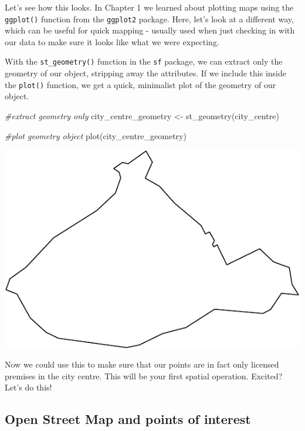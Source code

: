 \documentclass[
]{book}
\makeatletter
\newenvironment{Shaded}{\begin{snugshade}}{\end{snugshade}}
\newcommand{\CommentTok}[1]{\textcolor[rgb]{0.37,0.37,0.37}{\textit{#1}}}
\newcommand{\FunctionTok}[1]{\textcolor[rgb]{0,0,0}{#1}}
\newcommand{\NormalTok}[1]{#1}
\newcommand{\OtherTok}[1]{\textcolor[rgb]{0.37,0.37,0.37}{#1}}
\newenvironment{kframe}{%
\medskip{}
\setlength{\fboxsep}{.8em}
 \def\at@end@of@kframe{}%
 \ifinner\ifhmode%
  \def\at@end@of@kframe{\end{minipage}}%
  \begin{minipage}{\columnwidth}%
 \fi\fi%
 \def\FrameCommand##1{\hskip\@totalleftmargin \hskip-\fboxsep
 \colorbox{shadecolor}{##1}\hskip-\fboxsep
     \hskip-\linewidth \hskip-\@totalleftmargin \hskip\columnwidth}%
 \MakeFramed {\advance\hsize-\width
   \@totalleftmargin\z@ \linewidth\hsize
   \@setminipage}}%
 {\par\unskip\endMakeFramed%
 \at@end@of@kframe}
\renewenvironment{Shaded}{\begin{kframe}}{\end{kframe}}
\makeatother
\begin{document}
Let's see how this looks. In Chapter 1 we learned about plotting maps using the \texttt{ggplot()} function from the \texttt{ggplot2} package. Here, let's look at a different way, which can be useful for quick mapping - usually used when just checking in with our data to make sure it looks like what we were expecting.

With the \texttt{st\_geometry()} function in the \texttt{sf} package, we can extract only the geometry of our object, stripping away the attributes. If we include this inside the \texttt{plot()} function, we get a quick, minimalist plot of the geometry of our object.

\begin{Shaded}
\begin{Highlighting}[]
\CommentTok{\#extract geometry only}
\NormalTok{city\_centre\_geometry }\OtherTok{\textless{}{-}} \FunctionTok{st\_geometry}\NormalTok{(city\_centre)}

\CommentTok{\#plot geometry object}
\FunctionTok{plot}\NormalTok{(city\_centre\_geometry)}
\end{Highlighting}
\end{Shaded}

\includegraphics{crime_mapping_files/figure-latex/plot_2b-1.pdf}

Now we could use this to make sure that our points are in fact only licensed premises in the city centre. This will be your first spatial operation. Excited? Let's do this!

\hypertarget{open-street-map-and-points-of-interest}{%
\subsection{Open Street Map and points of interest}\label{open-street-map-and-points-of-interest}}
\end{document}
